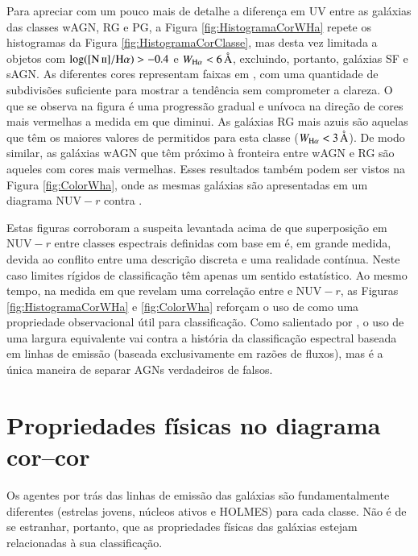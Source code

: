 Para apreciar com um pouco mais de detalhe a diferença em UV entre as galáxias
das classes wAGN, RG e PG, a Figura \ref{fig:HistogramaCorWHa} repete os
histogramas da Figura \ref{fig:HistogramaCorClasse}, mas desta vez limitada a
objetos com $\log(\nII/\Halpha) > -0.4$ e $\WHa < 6\,\text{\AA}$, excluindo,
portanto, galáxias SF e sAGN. As diferentes cores representam faixas em \WHa,
com uma quantidade de subdivisões suficiente para mostrar a tendência sem
comprometer a clareza. O que se observa na figura é uma progressão gradual e
unívoca na direção de cores mais vermelhas a medida em que \WHa diminui. As
galáxias RG mais azuis são aquelas que têm os maiores valores de \WHa permitidos
para esta classe ($\WHa < 3\,\text{\AA}$). De modo similar, as galáxias wAGN que
têm \WHa próximo à fronteira entre wAGN e RG são aqueles com cores mais
vermelhas. Esses resultados também podem ser vistos na Figura
\ref{fig:ColorWha}, onde as mesmas galáxias são apresentadas em um diagrama
$\mathrm{NUV}-r$ contra \WHa.

Estas figuras corroboram a suspeita levantada acima de que superposição em
$\mathrm{NUV}-r$ entre classes espectrais definidas com base em \WHa é, em
grande medida, devida ao conflito entre uma descrição discreta e uma realidade
contínua. Neste caso limites rígidos de classificação têm apenas um sentido
estatístico. Ao mesmo tempo, na medida em que revelam uma correlação entre \WHa
e $\mathrm{NUV}-r$, as Figuras \ref{fig:HistogramaCorWHa} e \ref{fig:ColorWha}
reforçam o uso de \WHa como uma propriedade observacional útil para
classificação. Como salientado por \citet{CidFernandes2011}, o uso de uma
largura equivalente vai contra a história da classificação espectral baseada em
linhas de emissão (baseada exclusivamente em razões de fluxos), mas é a única
maneira de separar AGNs verdadeiros de falsos.



\section{Propriedades físicas no diagrama cor--cor}
\label{sec:Analise:PropFisicas}

Os agentes por trás das linhas de emissão das galáxias são fundamentalmente
diferentes (estrelas jovens, núcleos ativos e HOLMES) para cada classe. Não é de
se estranhar, portanto, que as propriedades físicas das galáxias estejam
relacionadas à sua classificação.


